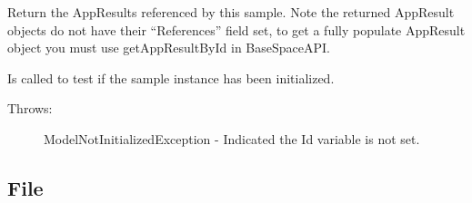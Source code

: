 \documentclass[letterpaper,10pt,english]{sphinxmanual}
\begin{document}
\begin{fulllineitems}
\begin{fulllineitems}
\end{fulllineitems}


\begin{fulllineitems}
\label{Available modules:BaseSpacePy.model.Sample.Sample.getReferencedAppResults}
Return the AppResults referenced by this sample. Note the returned AppResult objects
do not have their ``References'' field set, to get a fully populate AppResult object
you must use getAppResultById in BaseSpaceAPI.

\end{fulllineitems}


\begin{fulllineitems}
\label{Available modules:BaseSpacePy.model.Sample.Sample.isInit}
Is called to test if the sample instance has been initialized.
\begin{description}
\item[{Throws:}] \leavevmode
ModelNotInitializedException - Indicated the Id variable is not set.

\end{description}

\end{fulllineitems}


\end{fulllineitems}



\subsection{File}
\label{Available modules:file}
\end{document}
